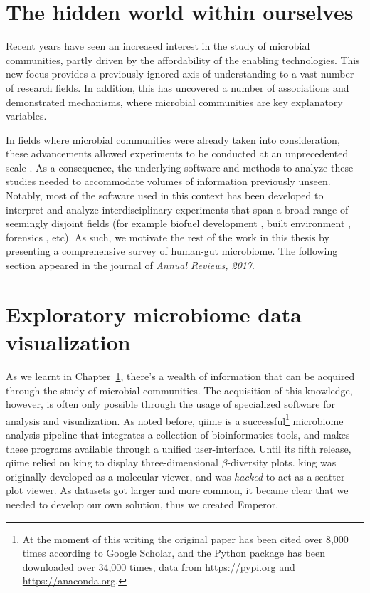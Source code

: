 \documentclass[12pt,chapterheads]{ucsd}
\begin{document}
%




\chapter{The hidden world within ourselves}\label{chapter_review}

Recent years have seen an increased interest in the study of microbial
communities, partly driven by the affordability of the enabling technologies.
This new focus provides a previously ignored axis of understanding to a vast
number of research fields. In addition, this has uncovered a number of
associations and demonstrated mechanisms, where microbial communities are key
explanatory variables.

In fields where microbial communities were already taken into consideration,
these advancements allowed experiments to be conducted at an unprecedented
scale \cite{RN35, RN4061, RN4267}. As a consequence, the underlying software
and methods to analyze these studies needed to accommodate volumes of
information previously unseen. Notably, most of the software used in this
context has been developed to interpret and analyze interdisciplinary
experiments that span a broad range of seemingly disjoint fields (for example
biofuel development \cite{RN4268}, built environment \cite{RN4270, RN4083},
forensics \cite{RN4269, RN4271}, etc).  As such, we motivate the rest of the
work in this thesis by presenting a comprehensive survey of human-gut
microbiome.  The following section appeared in the journal of \textsl{Annual
Reviews, 2017}.

\ifdefined\RELEASE
    
\fi

\chapter{Exploratory microbiome data visualization}\label{exploratory_chapter}

As we learnt in Chapter~\ref{chapter_review}, there's a wealth of information 
that can be acquired through the study of microbial communities. The 
acquisition of this knowledge, however, is often only possible through the 
usage of specialized software for analysis and visualization. As noted before, 
\gls{qiime} is a successful\footnote{At the moment of this writing the original 
paper has been cited over 8,000 times according to Google Scholar, and the 
Python package has been downloaded over 34,000 times, data from 
\url{https://pypi.org} and \url{https://anaconda.org}.} microbiome analysis 
pipeline that integrates a collection of bioinformatics tools, and makes these 
programs available through a unified user-interface. Until its fifth release, 
\gls{qiime} relied on \gls{king} to display three-dimensional $\beta$-diversity 
plots. \gls{king} was originally developed as a molecular viewer, and was 
\textit{hacked} to act as a scatter-plot viewer. As datasets got larger and 
more common, it became clear that we needed to develop our own solution, thus 
we created Emperor.
\end{document}
